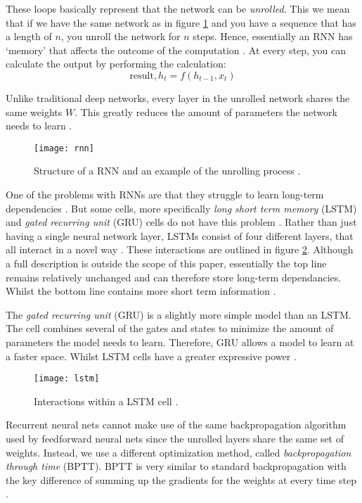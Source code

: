 These loops basically represent that the network can be \textit{unrolled}.
This we mean that if we have the same network as in figure \ref{fig:rnn} and you have a sequence that has a length of $n$, you unroll the network for $n$ steps.
Hence, essentially an RNN has `memory' that affects the outcome of the computation \cite{britz_2016}.
At every step, you can calculate the output by performing the calculation:
$$\text{result}, h_t = f(h_{t - 1}, x_t)$$

Unlike traditional deep networks, every layer in the unrolled network shares the same weights $W$.
This greatly reduces the amount of parameters the network needs to learn \cite{britz_2016}.

\begin{figure}[ht]
  \centering
  \texttt{[image: rnn]}
  \caption{Structure of a RNN and an example of the unrolling process \cite{britz_2016}.}
  \label{fig:rnn}
\end{figure}

One of the problems with RNNs are that they struggle to learn long-term dependencies \cite{bengio1994learning}.
But some cells, more specifically \textit{long short term memory} (LSTM) and \textit{gated recurring unit} (GRU) cells do not have this problem \cite{hochreiter1997long,LSTM,cho2014learning}.
Rather than just having a single neural network layer, LSTMs consist of four different layers, that all interact in a novel way \cite{LSTM}.
These interactions are outlined in figure \ref{fig:lstm}.
Although a full description is outside the scope of this paper, essentially the top line remains relatively unchanged and can therefore store long-term dependancies.
Whilst the bottom line contains more short term information \cite{LSTM,hochreiter1997long}.

\newpage

The \textit{gated recurring unit} (GRU) is a slightly more simple model than an LSTM.
The cell combines several of the gates and states to minimize the amount of parameters the model needs to learn.
Therefore, GRU allows a model to learn at a faster space.
Whilst LSTM cells have a greater expressive power \cite{hochreiter1997long,LSTM,cho2014learning}.

\begin{figure}[ht]
  \centering
  \texttt{[image: lstm]}
  \caption{Interactions within a LSTM cell \cite{LSTM}.}
  \label{fig:lstm}
\end{figure}

Recurrent neural nets cannot make use of the same backpropagation algorithm used by feedforward neural nets since the unrolled layers share the same set of weights.
Instead, we use a different optimization method, called \textit{backpropagation through time} (BPTT).
BPTT is very similar to standard backpropagation with the key difference of summing up the gradients for the weights at every time step \cite{britz_2016}.

